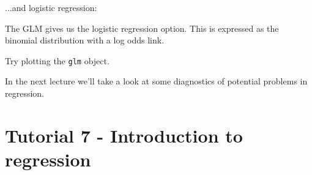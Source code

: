 \documentclass[titlepage]{book}\usepackage{knitr}
\begin{document}
\begin{knitrout}
\color{fgcolor}\begin{kframe}
\begin{alltt}
 \hlkwb{<-}  \hlopt{~}  \hlopt{+}  \hlopt{+}   \hlstd{=} 
    
\end{alltt}
\end{kframe}
\end{knitrout}

...and logistic regression:

The GLM gives us the logistic regression option. This is expressed as the binomial distribution with a log odds link.


\begin{knitrout}
\color{fgcolor}\begin{kframe}
\begin{alltt}
 \hlkwb{<-}  \hlopt{~}  \hlopt{+}  \hlopt{+}  \hlopt{+}  \hlopt{+} 
   \hlstd{=}   
\end{alltt}
\end{kframe}
\end{knitrout}
 Try plotting the \texttt{glm} object.
 
In the next lecture we'll take a look at some diagnostics of potential problems in regression.









\chapter{Tutorial 7 - Introduction to regression}

\author{Brian Williams $<$\href{mailto:bjw649@gmail.com}%
{bjw649@gmail.com}$>$}
\end{document}

